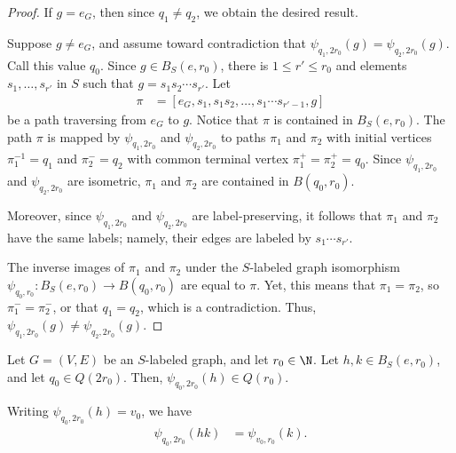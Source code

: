 \documentclass[10pt]{mypackage}
\begin{document}
\begin{proof}
  If $g = e_G$, then since $q_1\neq q_2$, we obtain the desired result.

  Suppose $g \neq e_G$, and assume toward contradiction that $\psi_{q_1,2r_0}(g) = \psi_{q_2,2r_0}(g)$. Call this value $q_0$. Since $g\in B_S\left(e, r_0 \right)$, there is $1\leq r' \leq r_0$ and elements $s_1,\dots,s_{r'}$ in $S$ such that $g = s_1s_2\cdots s_{r'}$. Let
  \begin{align*}
    \pi &= \left[ e_G,s_1,s_1s_2,\dots,s_1\cdots s_{r'-1},g \right]
  \end{align*}
  be a path traversing from $e_G$ to $g$. Notice that $\pi$ is contained in $B_S\left(e, r_0 \right)$. The path $\pi$ is mapped by $\psi_{q_1,2r_0}$ and $\psi_{q_2,2r_0}$ to paths $\pi_1$ and $\pi_2$ with initial vertices $\pi_1^{-1} = q_1$ and $\pi_2^{-} = q_2$ with common terminal vertex $\pi_{1}^{+} = \pi_2^{+} = q_0$. Since $\psi_{q_1,2r_0}$ and $\psi_{q_2,2r_0}$ are isometric, $\pi_1$ and $\pi_2$ are contained in $B\left( q_0,r_0 \right)$.

  Moreover, since $\psi_{q_1,2r_0}$ and $\psi_{q_2,2r_0}$ are label-preserving, it follows that $\pi_1$ and $\pi_2$ have the same labels; namely, their edges are labeled by $s_1\cdots s_{r'}$.

  The inverse images of $\pi_1$ and $\pi_2$ under the $S$-labeled graph isomorphism $\psi_{q_0,r_0}\colon B_S\left(e, r_0 \right)\rightarrow B\left( q_0,r_0 \right)$ are equal to $\pi$. Yet, this means that $\pi_1 = \pi_2$, so $\pi_1^{-} = \pi_2^{-}$, or that $q_1 = q_2$, which is a contradiction. Thus, $\psi_{q_1,2r_0}(g) \neq \psi_{q_2,2r_0}(g)$.
\end{proof}
\begin{lemma}
  Let $G = \left( V,E \right)$ be an $S$-labeled graph, and let $r_0\in \N$. Let $h,k\in B_S\left( e,r_0 \right)$, and let $q_0\in Q\left( 2r_0 \right)$. Then, $\psi_{q_0,2r_0}\left(h\right)\in Q\left( r_0 \right)$.

  Writing $\psi_{q_0,2r_0}(h) = v_0$, we have
  \begin{align*}
    \psi_{q_0,2r_0}\left( hk \right) &= \psi_{v_0,r_0}\left( k \right).
  \end{align*}
\end{lemma}
\end{document}
